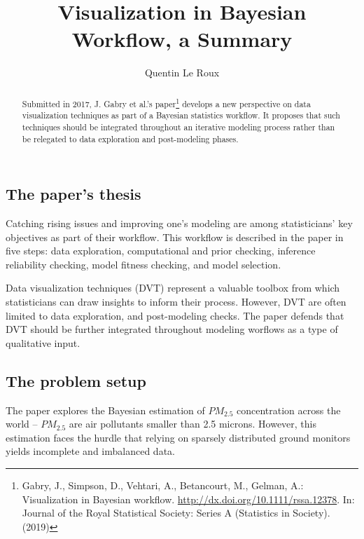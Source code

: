 \documentclass[runningheads]{llncs}
\begin{document}
%
\title{Visualization in Bayesian Workflow, a Summary}
%
%
\author{Quentin Le Roux}
%
%
\institute{}
%
\maketitle              %
%
\begin{abstract}
Submitted in 2017, J. Gabry et al.'s paper\footnote{Gabry, J., Simpson, D., Vehtari, A., Betancourt, M., Gelman, A.: Visualization in Bayesian workflow. \url{http://dx.doi.org/10.1111/rssa.12378}. In: Journal of the Royal Statistical Society: Series A (Statistics in Society). (2019)} develops a new perspective on data visualization techniques as part of a Bayesian statistics workflow. It proposes that such techniques should be integrated throughout an iterative modeling process rather than be relegated to data exploration and post-modeling phases.
\end{abstract}

\subsection*{The paper's thesis}

Catching rising issues and improving one's modeling are among statisticians' key objectives as part of their workflow. This workflow is described in the paper in five steps: data exploration, computational and prior checking, inference reliability checking, model fitness checking, and model selection.

Data visualization techniques (DVT) represent a valuable toolbox from which statisticians can draw insights to inform their process. However, DVT are often limited to data exploration, and post-modeling checks. The paper defends that DVT should be further integrated throughout modeling worflows as a type of qualitative input. 

\subsection*{The problem setup}

The paper explores the Bayesian estimation of $PM_{2.5}$ concentration across the world -- $PM_{2.5}$ are air pollutants smaller than 2.5 microns. However, this estimation faces the hurdle that relying on sparsely distributed ground monitors yields incomplete and imbalanced data.
\end{document}

